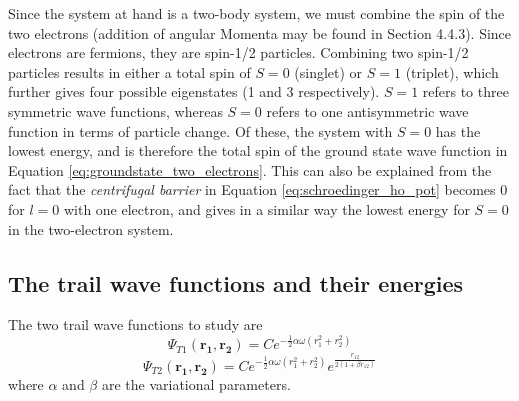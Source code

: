 \documentclass[12pt,english,a4paper]{article}
\begin{document}
Since the system at hand is a two-body system, we must combine the spin of the two electrons (addition of angular Momenta may be found in \cite{Griffiths} Section 4.4.3). Since electrons are fermions, they are spin-1/2 particles. Combining two spin-1/2 particles results in either a total spin of $S=0$ (singlet) or $S=1$ (triplet), which further gives four possible eigenstates (1 and 3 respectively). $S=1$ refers to three symmetric wave functions, whereas $S=0$ refers to one antisymmetric wave function in terms of particle change. Of these, the system with $S=0$ has the lowest energy, and is therefore the total spin of the ground state wave function in Equation \eqref{eq:groundstate_two_electrons}. This can also be explained from the fact that the \textit{centrifugal barrier} in Equation \eqref{eq:schroedinger_ho_pot} becomes $0$ for $l=0$ with one electron, and gives in a similar way the lowest energy for $S=0$ in the two-electron system.

\subsection{The trail wave functions and their energies} \label{section:theory:energies}

The two trail wave functions to study are
\begin{equation}
    \Psi_{T1}(\boldsymbol{r_1},\boldsymbol{r_2})=Ce^{-\frac{1}{2}\alpha\omega(r_1^2+r_2^2)}
    \label{eq:trail_one}
\end{equation}
\begin{equation}
    \Psi_{T2}(\boldsymbol{r_1},\boldsymbol{r_2})=Ce^{-\frac{1}{2}\alpha\omega(r_1^2+r_2^2)}e^{\frac{r_{12}}{2(1+\beta r_{12})}}
    \label{eq:trail_two}
\end{equation}
where $\alpha$ and $\beta$ are the variational parameters.
\end{document}
